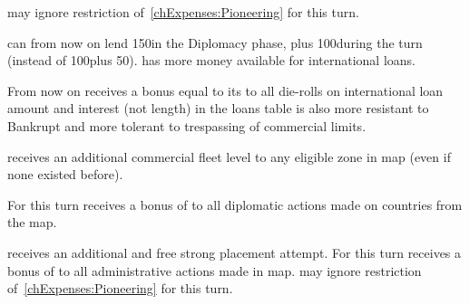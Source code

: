 


\phadm
\aparag \ENG may ignore restriction of~\ref{chExpenses:Pioneering} for this
turn.

\effetlong
\aparag \ENG can from now on lend 150\ducats in the Diplomacy phase, plus
100\ducats during the turn (instead of 100\ducats plus 50\ducats).
\aparag \ENG has more money available for international loans.
\begin{oldcompta}
  \aparag From now on \ENG receives a bonus equal to its \DTI to all die-rolls
  on international loan amount and interest (not length) in the loans table
  \aparag \ENG is also more resistant to Bankrupt and more tolerant to
  trespassing of commercial limits.
\end{oldcompta}










\phevnt
\aparag \HOL receives an additional commercial fleet level to any eligible
\STZ zone in \ROTW map (even if none existed before).

\phdipl
\aparag For this turn \HOL receives a bonus of  to all diplomatic
actions made on countries from the \ROTW map.

\phadm
\aparag \HOL receives an additional and free strong \TP placement attempt.
\aparag For this turn \HOL receives a bonus of  to all
administrative actions made in \ROTW map.
\aparag \HOL may ignore restriction of~\ref{chExpenses:Pioneering} for this
turn.



